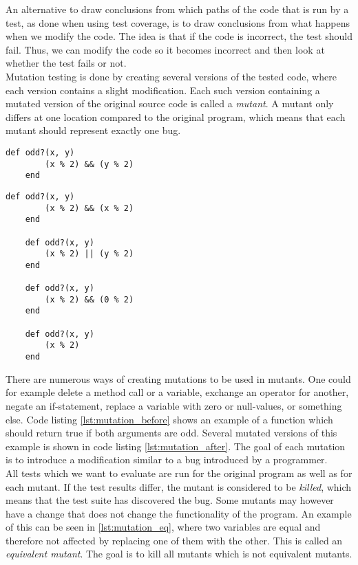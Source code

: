 An alternative to draw conclusions from which paths of the code that is
run by a test, as done when using test coverage, is to draw conclusions
from what happens when we modify the code. The idea is that if the code
is incorrect, the test should fail. Thus, we can modify the code so it
becomes incorrect and then look at whether the test fails or not.\\

Mutation testing is done by creating several versions of the tested
code, where each version contains a slight modification. Each
such version containing a mutated version of the original source code is
called a \emph{mutant}. A mutant only differs at one location compared
to the original program, which means that each mutant should represent
exactly one bug.\cite{article:mutation, wiki:mutation}\\

\begin{lstlisting}[caption=Example of a piece of code before mutation,
                   label=lst:mutation_before, float=t]
    def odd?(x, y)
        (x % 2) && (y % 2)
    end
\end{lstlisting}


\begin{lstlisting}[caption=Mutated versions of \ref{lst:mutation_before},
                   label=lst:mutation_after, float=t]
    def odd?(x, y)
        (x % 2) && (x % 2)
    end

    def odd?(x, y)
        (x % 2) || (y % 2)
    end

    def odd?(x, y)
        (x % 2) && (0 % 2)
    end

    def odd?(x, y)
        (x % 2)
    end
\end{lstlisting}

There are numerous ways of creating mutations to be used in mutants. One
could for example delete a method call or a variable, exchange an
operator for another, negate an if-statement, replace a variable with
zero or null-values, or something else. Code listing
\ref{lst:mutation_before} shows an example of a function which should
return true if both arguments are odd. Several mutated versions of this
example is shown in code listing \ref{lst:mutation_after}. The goal of
each mutation is to introduce a modification similar to a bug introduced
by a programmer.\cite{article:mutation}\\

All tests which we want to evaluate are run for the original program as
well as for each mutant. If the test results differ, the mutant is
considered to be \emph{killed}, which means that the test suite has
discovered the bug. Some mutants may however have a change that does not
change the functionality of the program. An example of this can be seen
in \ref{lst:mutation_eq}, where two variables are equal and therefore
not affected by replacing one of them with the other. This is called
an \emph{equivalent mutant}. The goal is to kill all mutants which is
not equivalent mutants.\cite{article:mutation, wiki:mutation}\\

